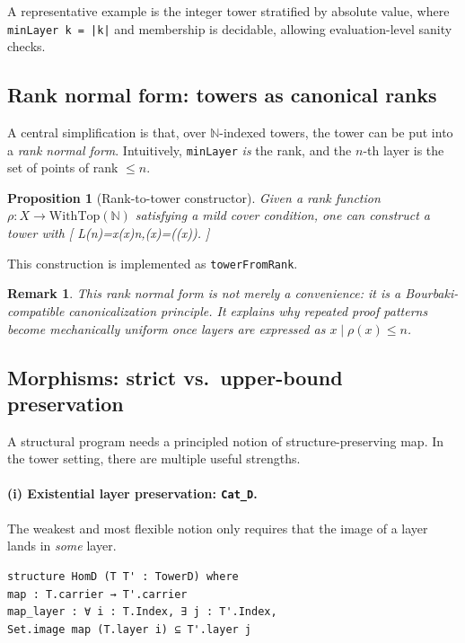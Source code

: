 \documentclass[11pt]{article}
\newtheorem{proposition}{Proposition}
\newtheorem{remark}{Remark}
\begin{document}
A representative example is the integer tower stratified by absolute value, where \texttt{minLayer k = |k|} and membership is decidable, allowing evaluation-level sanity checks. %

\subsection{Rank normal form: towers as canonical ranks}

A central simplification is that, over $\mathbb N$-indexed towers, the tower can be put into a \emph{rank normal form}. Intuitively, \texttt{minLayer} \emph{is} the rank, and the $n$-th layer is the set of points of rank $\le n$.

\begin{proposition}[Rank-to-tower constructor]
Given a rank function $\rho : X \to \mathrm{WithTop}(\mathbb N)$ satisfying a mild cover condition, one can construct a tower with
[
L(n)={x\mid \rho(x)\le n},\qquad \minLayer(x)=((x)).
]
\end{proposition}

This construction is implemented as \texttt{towerFromRank}. %

\begin{remark}
This rank normal form is not merely a convenience: it is a Bourbaki-compatible \emph{canonicalization} principle. It explains why repeated proof patterns become mechanically uniform once layers are expressed as ${x\mid \rho(x)\le n}$. %
\end{remark}

\subsection{Morphisms: strict vs.\ upper-bound preservation}

A structural program needs a principled notion of structure-preserving map. In the tower setting, there are multiple useful strengths.

\paragraph{(i) Existential layer preservation: \texttt{Cat_D}.}
The weakest and most flexible notion only requires that the image of a layer lands in \emph{some} layer.

\begin{lstlisting}[language={},caption={Lean skeleton: \texttt{Cat_D} morphism}]
structure HomD (T T' : TowerD) where
map : T.carrier → T'.carrier
map_layer : ∀ i : T.Index, ∃ j : T'.Index,
Set.image map (T.layer i) ⊆ T'.layer j
\end{lstlisting}
\end{document}
